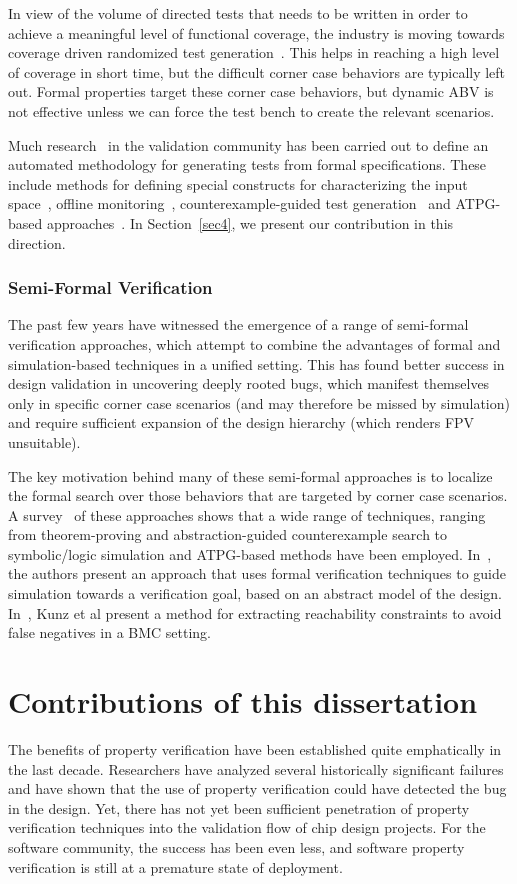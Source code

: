 \documentclass[a4paper, 11pt]{article}
\begin{document}
In view of the volume of directed tests that needs to be written in order to
achieve a meaningful level of functional coverage, the industry is moving
towards coverage driven randomized test generation~\cite{rvm}. This helps 
in reaching
a high level of coverage in short time, but the difficult corner case
behaviors are typically left out. Formal properties target these
corner case behaviors, but dynamic ABV is not effective unless we can force
the test bench to create the relevant scenarios.

Much research~\cite{ammann, garg, SAT:01} in the validation community has 
been carried out to define an automated methodology for generating tests 
from formal specifications. These include methods for defining special 
constructs for characterizing the input space~\cite{clarke:00a}, 
offline monitoring~\cite{tasiran}, counterexample-guided test 
generation~\cite{ammann} and ATPG-based approaches~\cite{abraham}.
In Section~\ref{sec4}, we present our contribution in this direction.

\subsubsection{Semi-Formal Verification} \label{sec2.2.3}
The past few years have witnessed the emergence of a range of 
semi-formal verification approaches, which attempt to combine the 
advantages of formal and simulation-based techniques in a unified 
setting. This has found better success in design 
validation in uncovering deeply rooted bugs, which manifest themselves 
only in specific corner case scenarios (and may therefore be missed by 
simulation) and require sufficient expansion of the design 
hierarchy (which renders FPV unsuitable).

The key motivation behind many of these semi-formal approaches is 
to localize the formal search over those behaviors that are targeted by
corner case scenarios. A survey~\cite{guido}
of these approaches shows that a wide range of techniques, ranging from
theorem-proving and abstraction-guided counterexample
search to symbolic/logic simulation and ATPG-based methods have been
employed. In~\cite{guido}, the authors present an
approach that uses formal verification techniques to guide simulation
towards a verification goal, based on an abstract model of the design.
In~\cite{kunz}, Kunz et al present a method for extracting
reachability constraints to avoid false negatives in a BMC setting. 

\section{Contributions of this dissertation} \label{sec3}
The benefits of property verification have been established quite 
emphatically in the last decade. Researchers have analyzed several 
historically significant failures and have shown that the use of property 
verification could have detected the bug in the design.
Yet, there has not yet been sufficient penetration of property verification 
techniques into the validation flow of chip design projects. For the 
software community, the success has been even less, and software property 
verification is still at a premature state of deployment. 
\end{document}
